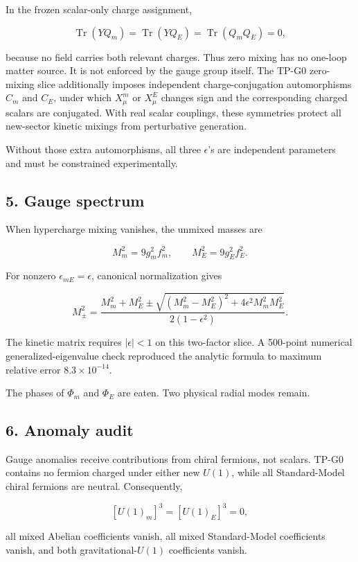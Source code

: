 \documentclass[
]{article}
\begin{document}
In the frozen scalar-only charge assignment,

\[
\operatorname{Tr}(YQ_m)=\operatorname{Tr}(YQ_E)
=\operatorname{Tr}(Q_mQ_E)=0,
\]

because no field carries both relevant charges. Thus zero mixing has no
one-loop matter source. It is not enforced by the gauge group itself.
The TP-G0 zero-mixing slice additionally imposes independent
charge-conjugation automorphisms \(C_m\) and \(C_E\), under which
\(X^m_\mu\) or \(X^E_\mu\) changes sign and the corresponding charged
scalars are conjugated. With real scalar couplings, these symmetries
protect all new-sector kinetic mixings from perturbative generation.

Without those extra automorphisms, all three \(\epsilon\)'s are
independent parameters and must be constrained experimentally.

\hypertarget{gauge-spectrum}{%
\subsection{5. Gauge spectrum}\label{gauge-spectrum}}

When hypercharge mixing vanishes, the unmixed masses are

\[
M_m^2=9g_m^2f_m^2,
\qquad
M_E^2=9g_E^2f_E^2.
\]

For nonzero \(\epsilon_{mE}=\epsilon\), canonical normalization gives

\[
M_\pm^2=
\frac{M_m^2+M_E^2\pm
\sqrt{(M_m^2-M_E^2)^2+4\epsilon^2M_m^2M_E^2}}
{2(1-\epsilon^2)}.
\]

The kinetic matrix requires \(|\epsilon|<1\) on this two-factor slice. A
500-point numerical generalized-eigenvalue check reproduced the analytic
formula to maximum relative error \(8.3\times10^{-14}\).

The phases of \(\Phi_m\) and \(\Phi_E\) are eaten. Two physical radial
modes remain.

\hypertarget{anomaly-audit}{%
\subsection{6. Anomaly audit}\label{anomaly-audit}}

Gauge anomalies receive contributions from chiral fermions, not scalars.
TP-G0 contains no fermion charged under either new \(U(1)\), while all
Standard-Model chiral fermions are neutral. Consequently,

\[
[U(1)_m]^3=[U(1)_E]^3=0,
\]

all mixed Abelian coefficients vanish, all mixed Standard-Model
coefficients vanish, and both gravitational-\(U(1)\) coefficients
vanish.
\end{document}
